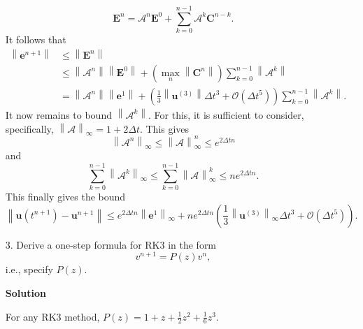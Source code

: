 \documentclass{article}
\begin{document}
\begin{itemize}
\begin{equation*}
\mathbf{E}^n = \mathcal{A}^n \mathbf{E}^0 + \sum_{k = 0}^{n-1} \mathcal{A}^k \mathbf{C}^{n-k}.
\end{equation*}
It follows that
\begin{align*}
\left\lVert \mathbf{e}^{n+1} \right\rVert
& \leq \left\lVert \mathbf{E}^n \right\rVert \\
& \leq \left\lVert \mathcal{A}^n \right\rVert \left\lVert \mathbf{E}^0 \right\rVert + \left( \max_{n} \left\lVert \mathbf{C}^n \right\rVert \right) \sum_{k = 0}^{n-1} \left\lVert \mathcal{A}^k \right\rVert \\
& = \left\lVert \mathcal{A}^n \right\rVert \left\lVert \mathbf{e}^1 \right\rVert + \left( \frac{1}{3} \left\lVert \mathbf{u}^{(3)} \right\rVert \Delta t^3 + \mathcal{O} \left( \Delta t^5 \right) \right) \sum_{k = 0}^{n-1} \left\lVert \mathcal{A}^k \right\rVert.
\end{align*}
It now remains to bound $\left\lVert \mathcal{A}^k \right\rVert$. For this, it is sufficient to consider, specifically, $\left\lVert \mathcal{A} \right\rVert_{\infty} = 1 + 2 \Delta t$. This gives
\begin{equation*}
\left\lVert \mathcal{A}^n \right\rVert_{\infty} \leq \left\lVert \mathcal{A} \right\rVert_{\infty}^n \leq e^{2 \Delta t n}
\end{equation*}
and
\begin{equation*}
\sum_{k = 0}^{n-1} \left\lVert \mathcal{A}^k \right\rVert_{\infty} \leq \sum_{k = 0}^{n-1} \left\lVert \mathcal{A} \right\rVert_{\infty}^k \leq n e^{2 \Delta t n}.
\end{equation*}
This finally gives the bound
\begin{equation*}
\left\lVert \mathbf{u} \left( t^{n+1} \right) - \mathbf{u}^{n+1} \right\rVert \leq e^{2 \Delta t n} \left\lVert \mathbf{e}^1 \right\rVert_{\infty} + n e^{2 \Delta t n} \left( \frac{1}{3} \left\lVert \mathbf{u}^{(3)} \right\rVert_{\infty} \Delta t^3 + \mathcal{O} \left( \Delta t^5 \right) \right).
\end{equation*}

\item[3.] Derive a one-step formula for RK3 in the form
\begin{equation*}
v^{n+1} = P(z) v^n,
\end{equation*}
i.e., specify $P(z)$.

{\bf Solution}

For any RK3 method, $P(z) = 1 + z + \frac{1}{2} z^2 + \frac{1}{6} z^3$.


\end{itemize}
\end{document}
